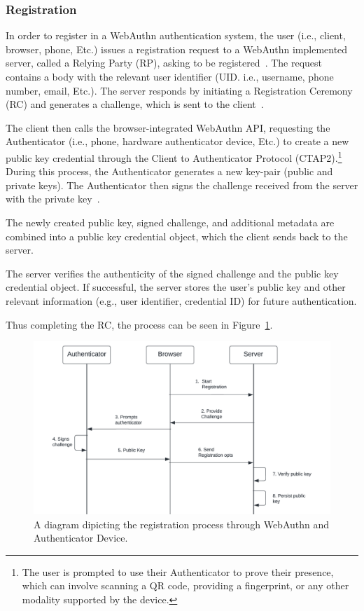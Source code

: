 
\newcommand{\credIdentifier}{\footnote{
  There is a requirement to check whether the credential identifier, generated
  by the Authenticator device exsits on the server.
  For further discussions on this topic, see section \hyperref[sec:futurework]{Future work}}}

\subsubsection{Registration}\label{subsubsec:registration}
In order to register in a WebAuthn authentication system, the user (i.e.,
client, browser, phone, Etc.) issues a registration request to a
WebAuthn implemented server, called a Relying Party (RP), asking to be
registered~\cite{webauthn-2-rp}.
The request contains a body with the relevant user identifier (UID. i.e.,
username, phone number, email, Etc.).
The server responds by initiating a Registration Ceremony (RC) and generates a
challenge, which is sent to the client~\cite{webauthn-2}.

The client then calls the browser-integrated WebAuthn API, requesting the
Authenticator (i.e., phone, hardware authenticator device, Etc.)
to create a new public key credential through the Client to Authenticator
Protocol (CTAP2).\footnote{
  The user is prompted to use their Authenticator to prove their presence,
  which can involve scanning a QR code, providing a fingerprint, or any other
  modality supported by the device.}
During this process, the Authenticator generates a new key-pair (public and
private keys).
The Authenticator then signs the challenge received from the server with the
private key~\cite{webauthn-2-registering}.

The newly created public key, signed challenge, and additional metadata are
combined into a public key credential object, which the client sends back to
the server.

The server verifies the authenticity of the signed challenge and the public key
credential object.
If successful, the server stores the user's public key and other relevant
information (e.g., user identifier, credential ID) for future authentication.

Thus completing the RC, the process can be seen in
Figure~\ref{fig:registration}.
\begin{figure}[htbp]
  \centering
  \includegraphics[width=0.75\linewidth]{images/Registration}
  \caption{\footnotesize A diagram dipicting the registration process through WebAuthn and Authenticator Device.}
  \label{fig:registration}
\end{figure}

